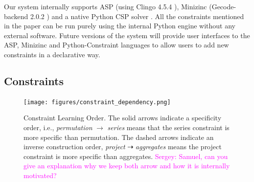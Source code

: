 \documentclass{ecai}
\newcommand{\sergey}[1]{\textcolor{magenta}{{\sc Sergey:} #1}\xspace}
\newcommand{\format}[1]{\textit{#1}\xspace}
\begin{document}
Our system internally supports ASP (using Clingo 4.5.4 \cite{clingo}), Minizinc (Gecode-backend 2.0.2 \cite{minizinc}) and a native Python CSP solver \cite{python_constraint}. All the constraints mentioned in the paper can be run purely using the internal Python engine without any external software. Future versions of the system will provide user interfaces to the ASP, Minizinc and Python-Constraint languages to allow users to add new constraints in a declarative way.

\subsection{Constraints}

\begin{figure}[htb]
  \centering
  \texttt{[image: figures/constraint\_dependency.png]}
  \caption{Constraint Learning Order. The solid arrows indicate a specificity order, i.e., \textit{permutation} $\rightarrow$ \textit{series} means that the series constraint is more specific than permutation. The dashed arrows indicate an inverse construction order, \textit{project} $\dashrightarrow$ \textit{aggregates} means the project constraint is more specific than aggregates. \sergey{Samuel,  can you give an explanation why we keep both arrow and how it is internally motivated?}}
  \label{fig:learning_order}
\end{figure}


\newcommand{\numeric}{\format{numeric}}
\newcommand{\textual}{\format{textual}}
\newcommand{\integer}{\format{integer}}
\newcommand{\discrete}{\format{discrete}}
\newcommand{\plength}{\format{length}}
\newcommand{\ptype}{\format{type}}
\newcommand{\ptable}{\format{table}}
\newcommand{\por}{\format{orientation}}
\newcommand{\prows}{\format{rows}}
\newcommand{\pcols}{\format{columns}}
\newcommand{\nat}{\mathcal{N}}
\end{document}
